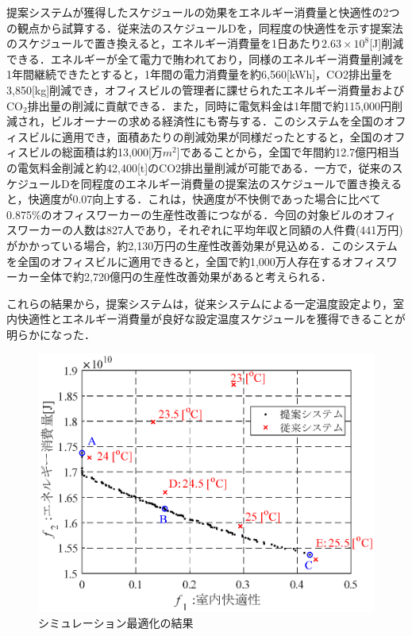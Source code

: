 提案システムが獲得したスケジュールの効果をエネルギー消費量と快適性の2つの観点から試算する．従来法のスケジュールDを，同程度の快適性を示す提案法のスケジュールで置き換えると，エネルギー消費量を1日あたり$2.63×10^8$[J]削減できる．エネルギーが全て電力で賄われており，同様のエネルギー消費量削減を1年間継続できたとすると，1年間の電力消費量を約6,560[kWh]，CO2排出量を3,850[kg]削減でき，オフィスビルの管理者に課せられたエネルギー消費量およびCO$_2$排出量の削減に貢献できる．また，同時に電気料金は1年間で約115,000円削減され，ビルオーナーの求める経済性にも寄与する．このシステムを全国のオフィスビルに適用でき，面積あたりの削減効果が同様だったとすると，全国のオフィスビルの総面積は約13,000[万$m^2$]である\cite{Fudoken19}ことから，全国で年間約12.7億円相当の電気料金削減と約42,400[t]のCO2排出量削減が可能である．一方で，従来のスケジュールDを同程度のエネルギー消費量の提案法のスケジュールで置き換えると，快適度が0.07向上する．これは，快適度が不快側であった場合に比べて0.875\%のオフィスワーカーの生産性改善につながる\cite{Iwahashi14, WGBC14}．今回の対象ビルのオフィスワーカーの人数は827人であり，それぞれに平均年収と同額の人件費(441万円)\cite{NTA19}がかかっている場合，約2,130万円の生産性改善効果が見込める．このシステムを全国のオフィスビルに適用できると，全国で約1,000万人存在するオフィスワーカー\cite{Fudoken19, Xymax19}全体で約2,720億円の生産性改善効果があると考えられる．

これらの結果から，提案システムは，従来システムによる一定温度設定より，室内快適性とエネルギー消費量が良好な設定温度スケジュールを獲得できることが明らかになった．

\begin{figure}[htbp]
  \begin{center}
    \includegraphics[width=0.7\linewidth]{fig/sim_result_pareto.eps}
  \end{center}
  \caption{シミュレーション最適化の結果}
  \label{fig::sim_result_pareto}
\end{figure}

